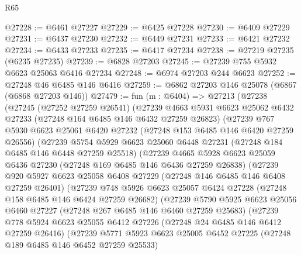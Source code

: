 \begin{lexlean}{R65}
\begin{coremodule}
{@27228 := @6461 @27227
@27229 := @6425 @27228
@27230 := @6409 @27229
@27231 := @6437 @27230
@27232 := @6449 @27231
@27233 := @6421 @27232
@27234 := @6433 @27233
@27235 := @6417 @27234
@27238 := @27219 @27235 (@6235 @27235)
@27239 := @6828 @27203
@27245 := @27239 @755 @5932 @6623 @25063 @6416 @27234
@27248 := @6974 @27203 @244 @6623
@27252 := @27248 @46 @6485 @146 @6416
@27259 := @6862 @27203 @146 @25078 (@6867 (@6868 @27203 @146))
@27479 := fun (m : @6404) =>
  @27213
    (@27238
      (@27245
        (@27252 @27259 @26541)
        (@27239
          @4663
          @5931
          @6623
          @25062
          @6432
          @27233
          (@27248 @164 @6485 @146 @6432 @27259 @26823)
          (@27239
            @767
            @5930
            @6623
            @25061
            @6420
            @27232
            (@27248 @153 @6485 @146 @6420 @27259 @26556)
            (@27239
              @5754
              @5929
              @6623
              @25060
              @6448
              @27231
              (@27248 @184 @6485 @146 @6448 @27259 @25518)
              (@27239
                @4665
                @5928
                @6623
                @25059
                @6436
                @27230
                (@27248 @169 @6485 @146 @6436 @27259 @26838)
                (@27239
                  @920
                  @5927
                  @6623
                  @25058
                  @6408
                  @27229
                  (@27248 @146 @6485 @146 @6408 @27259 @26401)
                  (@27239
                    @748
                    @5926
                    @6623
                    @25057
                    @6424
                    @27228
                    (@27248 @158 @6485 @146 @6424 @27259 @26682)
                    (@27239
                      @5790
                      @5925
                      @6623
                      @25056
                      @6460
                      @27227
                      (@27248 @267 @6485 @146 @6460 @27259 @25683)
                      (@27239
                        @778
                        @5924
                        @6623
                        @25055
                        @6412
                        @27226
                        (@27248 @24 @6485 @146 @6412 @27259 @26416)
                        (@27239
                          @5771
                          @5923
                          @6623
                          @25005
                          @6452
                          @27225
                          (@27248 @189 @6485 @146 @6452 @27259 @25533)
}
\end{coremodule}
\end{lexlean}
